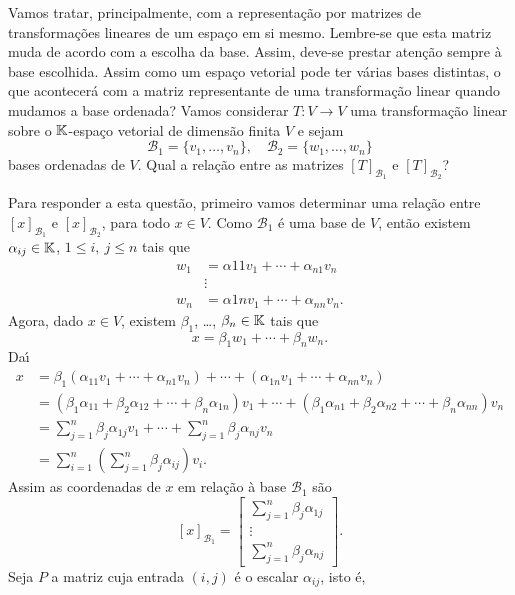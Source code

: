 Vamos tratar, principalmente, com a representa\c{c}\~ao por matrizes de transforma\c{c}\~oes lineares de um espa\c{c}o em si mesmo. Lembre-se que esta matriz muda de acordo com a escolha da base. Assim, deve-se prestar aten\c{c}\~ao sempre \`a base escolhida. Assim como um espa\c{c}o vetorial pode ter v\'arias bases distintas, o que acontecer\'a com a matriz representante de uma transforma\c{c}\~ao linear quando mudamos a base ordenada? Vamos considerar $T : V \to V$ uma transforma\c{c}\~ao linear sobre o $\mathbb{K}$-espa\c{c}o vetorial de dimens\~ao finita $V$ e sejam
\[
	\mathcal{B}_1 = \{v_1,\dots,v_n\}, \quad \mathcal{B}_2 = \{w_1,\dots,w_n\}
\]
bases ordenadas de $V$. Qual a rela\c{c}\~ao entre as matrizes $[T]_{\mathcal{B}_1}$ e $[T]_{\mathcal{B}_2}$?

Para responder a esta quest\~ao, primeiro vamos determinar uma rela\c{c}\~ao entre $[x]_{\mathcal{B}_1}$ e $[x]_{\mathcal{B}_2}$, para todo $x \in V$. Como $\mathcal{B}_1$ \'e uma base de $V$, ent\~ao existem $\alpha_{ij} \in \mathbb{K}$, $1 \le i,\ j \le n$ tais que
\begin{align*}
	w_1 &= \alpha{11}v_1 + \cdots + \alpha_{n1}v_n\\
	&\vdots\\
	w_n &= \alpha{1n}v_1 + \cdots + \alpha_{nn}v_n.
\end{align*}
Agora, dado $x \in V$, existem $\beta_1$, \dots, $\beta_n \in \mathbb{K}$ tais que
\[
	x = \beta_1w_1 + \cdots + \beta_nw_n.
\]
Da{\'\i}
\begin{align*}
	x &= \beta_1(\alpha_{11}v_1 + \cdots + \alpha_{n1}v_n) + \cdots + (\alpha_{1n}v_1 + \cdots + \alpha_{nn}v_n)\\
	&= (\beta_1\alpha_{11} + \beta_2\alpha_{12} + \cdots + \beta_n\alpha_{1n})v_1 + \cdots + (\beta_1\alpha_{n1} + \beta_2\alpha_{n2} + \cdots + \beta_n\alpha_{nn})v_n\\
	&= \sum_{j=1}^n\beta_j\alpha_{1j}v_1 + \cdots + \sum_{j=1}^n\beta_j\alpha_{nj}v_n\\
	&= \sum_{i=1}^n\left(\sum_{j=1}^n\beta_j\alpha_{ij}\right)v_i.
\end{align*}
Assim as coordenadas de $x$ em rela\c{c}\~ao \`a base $\mathcal{B}_1$ s\~ao
\[
	[x]_{\mathcal{B}_1} = \begin{bmatrix}
		\sum_{j=1}^n\beta_j\alpha_{1j}\\
		\vdots\\
		\sum_{j=1}^n\beta_j\alpha_{nj}
	\end{bmatrix}.
\]
Seja $P$ a matriz cuja entrada $(i,j)$ \'e o escalar $\alpha_{ij}$, isto \'e,
